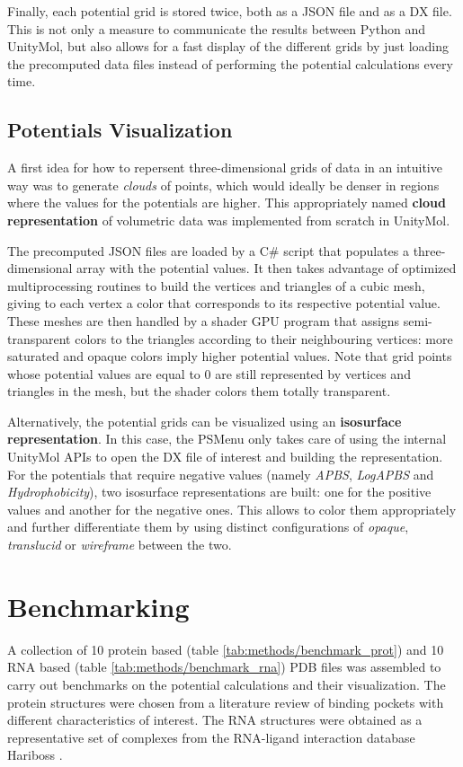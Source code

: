     Finally, each potential grid is stored twice, both as a JSON file and as a DX file. This is not only a measure to communicate the results between Python and UnityMol, but also allows for a fast display of the different grids by just loading the precomputed data files instead of performing the potential calculations every time.

  \subsection{Potentials Visualization}
    A first idea for how to repersent three-dimensional grids of data in an intuitive way was to generate \textit{clouds} of points, which would ideally be denser in regions where the values for the potentials are higher. This appropriately named \textbf{cloud representation} of volumetric data was implemented from scratch in UnityMol.

    The precomputed JSON files are loaded by a C\# script that populates a three-dimensional array with the potential values. It then takes advantage of optimized multiprocessing routines to build the vertices and triangles of a cubic mesh, giving to each vertex a color that corresponds to its respective potential value. These meshes are then handled by a shader GPU program that assigns semi-transparent colors to the triangles according to their neighbouring vertices: more saturated and opaque colors imply higher potential values. Note that grid points whose potential values are equal to 0 are still represented by vertices and triangles in the mesh, but the shader colors them totally transparent.

    Alternatively, the potential grids can be visualized using an \textbf{isosurface representation}. In this case, the PSMenu only takes care of using the internal UnityMol APIs to open the DX file of interest and building the representation. For the potentials that require negative values (namely \textit{APBS}, \textit{LogAPBS} and \textit{Hydrophobicity}), two isosurface representations are built: one for the positive values and another for the negative ones. This allows to color them appropriately and further differentiate them by using distinct configurations of \textit{opaque}, \textit{translucid} or \textit{wireframe} between the two.


\section{Benchmarking}
  A collection of 10 protein based (table \ref{tab:methods/benchmark_prot}) and 10 RNA based (table \ref{tab:methods/benchmark_rna}) PDB files was assembled to carry out benchmarks on the potential calculations and their visualization. The protein structures were chosen from a literature review of binding pockets with different characteristics of interest. The RNA structures were obtained as a representative set of complexes from the RNA-ligand interaction database Hariboss \cite{hariboss_2022}.

